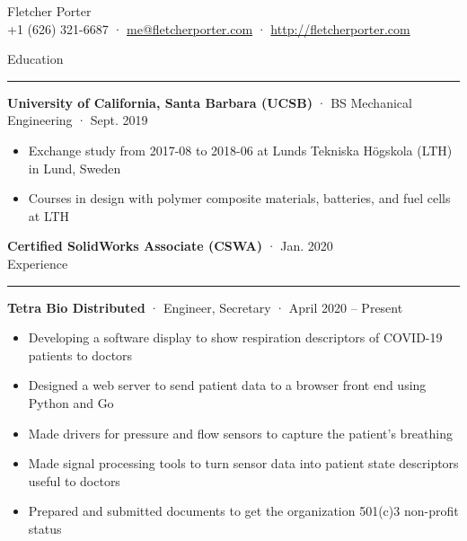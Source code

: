 \documentclass[12pt, oneside]{article}
\newcommand{\titlestyle}[1] {
	{\fontsize{40pt}{1em}\selectfont \textcolor{new_red}{\textsf{#1}}} \\
}
\newcommand{\headingstyleJobs}[1] {
	{\fontsize{18pt}{1em}\selectfont \textcolor{new_red}{\textsf{#1}}}
	\textcolor{new_red}{\rule{3.25in}{0.5pt}} \vspace{3pt}
}
\newcommand{\infostyle}[1] {
	{\selectfont #1} \\ \vspace{10pt}
}
\newcommand{\jobtitle}[3] {
	{\bf #1} · {#2} · {#3} \vspace{-7pt} \\
}
\newcommand{\certification}[2] {
	{\bf #1} · {#2} \vspace{5pt} \\
}
\begin{document}
\begin{flushleft}



\titlestyle{Fletcher Porter}
\infostyle{+1 (626) 321-6687 · \href{mailto:me@fletcherporter.com}{me@fletcherporter.com} · \url{http://fletcherporter.com}}


\headingstyleJobs{Education}

\jobtitle{University of California, Santa Barbara (UCSB)}{BS Mechanical Engineering}{Sept. 2019}
\begin{itemize}
	\item Exchange study from 2017-08 to 2018-06 at Lunds Tekniska Högskola (LTH) in Lund, Sweden \\
	\item Courses in design with polymer composite materials, batteries, and fuel cells at LTH
\end{itemize}



\certification{Certified SolidWorks Associate (CSWA)}{Jan. 2020}


\headingstyleJobs{Experience}

\jobtitle{Tetra Bio Distributed}{Engineer, Secretary}{April 2020 – Present}
\begin{itemize}
	\item Developing a software display to show respiration descriptors of COVID-19 patients to doctors \\
	\item Designed a web server to send patient data to a browser front end using Python and Go \\
	\item Made drivers for pressure and flow sensors to capture the patient's breathing \\
	\item Made signal processing tools to turn sensor data into patient state descriptors useful to doctors \\
	\item Prepared and submitted documents to get the organization 501(c)3 non-profit status \\
\end{itemize}


\end{flushleft}
\end{document}
